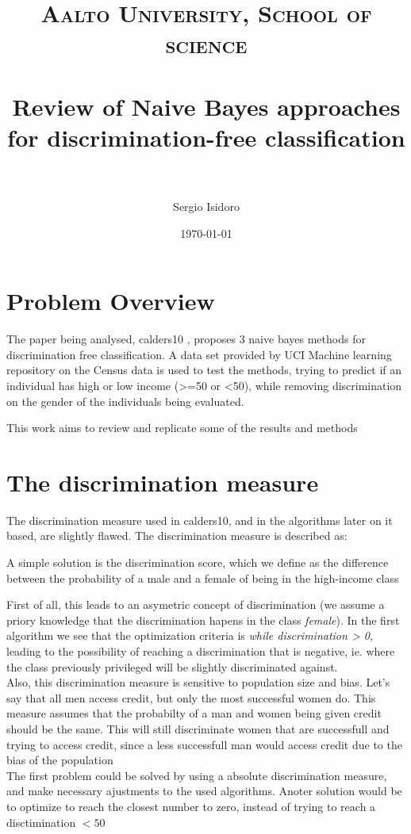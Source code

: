 \documentclass[paper=a4, fontsize=11pt]{scrartcl} %
\title{	
\normalfont \normalsize 
\textsc{Aalto University, School of science} \\ [25pt] %
\horrule{0.5pt} \\[0.4cm] %
\huge  Review of Naive Bayes approaches for discrimination-free classification \\ %
\horrule{2pt} \\[0.5cm] %
}
\author{Sergio Isidoro} %
\date{\normalsize\today} %
\numberwithin{equation}{section} %
\numberwithin{figure}{section} %
\numberwithin{table}{section} %
\begin{document}
\maketitle %


\section{Problem Overview}

The paper being analysed, calders10 \cite{calders10}, proposes 3 naive bayes methods for discrimination free classification. A data set provided by UCI Machine learning repository \cite{uc_repo} on the Census \cite{dataset} data is used to test the methods, trying to predict if an individual has high or low income (>=50 or <50), while removing discrimination on the gender of the individuals being evaluated.

This work aims to review and replicate some of the results and methods

\section{The discrimination measure}
The discrimination measure used in calders10, and in the algorithms later on it based, are slightly flawed. The discrimination measure is described as:
\begin{displayquote}
A simple solution is the discrimination score, which we define as the difference between the probability of a male and a female of being in the high-income class
\end{displayquote}
First of all, this leads to an asymetric concept of discrimination (we assume a priory knowledge that the discrimination hapens in the class \textit{female}). In the first algorithm we see that the optimization criteria is \textit{while discrimination > 0}, leading to the possibility of reaching a discrimination that is negative, ie. where the class previously privileged will be slightly discriminated against.
\\
Also, this discrimination measure is sensitive to population size and bias. Let's say that all men access credit, but only the most successful women do. This measure assumes that the probabilty of a man and women being given credit should be the same. This will still discriminate women that are successfull and trying to access credit, since a less successfull man would access credit due to the bias of the population
\\
The first problem could be solved by using a absolute discrimination measure, and make necessary ajustments to the used algorithms. Anoter solution would be to optimize to reach the closest number to zero, instead of trying to reach a disctimination $<50$
\end{document}

